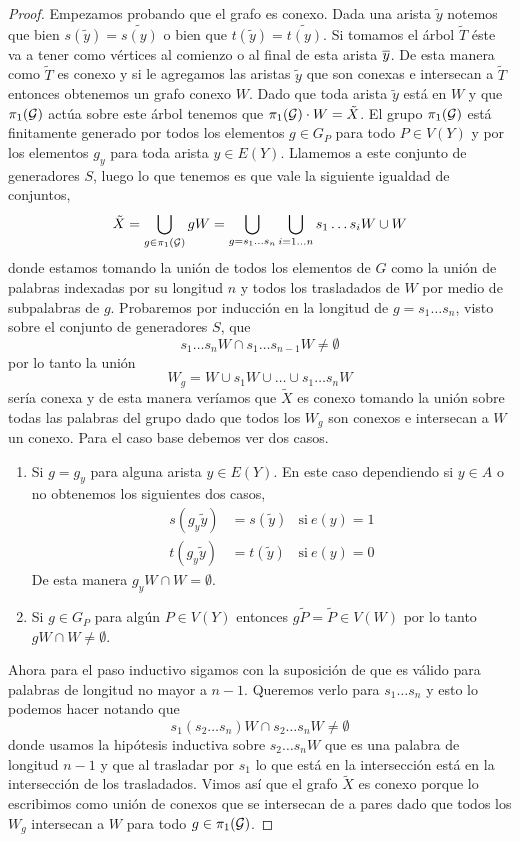 \documentclass[tesis.tex]{subfiles}
\begin{document}
\begin{proof}
	Empezamos probando que el grafo es conexo.
	Dada una arista $\tilde y$ notemos que bien $s(\tilde y) = \widetilde{s(y)}$ o bien que $t(\tilde y) = \widetilde{t(y)}$.
	Si tomamos el árbol $\tilde T$ éste va a tener como vértices al comienzo o al final de esta arista $\overline y$.
	De esta manera como $\tilde T$ es conexo y si le agregamos las aristas $\tilde y$ que son conexas e intersecan a $\tilde T$ entonces obtenemos un grafo conexo $W$.
	Dado que toda arista $\tilde y$ está en $W$ y que $\pi_1({\cal G})$ actúa sobre este árbol tenemos que $\pi_1({\cal G}) \cdot W = \tilde X$.
	El grupo $\pi_1({\cal G})$ está finitamente generado por todos los elementos $g \in G_P$ para todo $P \in V(Y)$ y por los elementos $g_y$ para toda arista $y \in E(Y)$.
	Llamemos a este conjunto de generadores $S$, luego lo que tenemos es que vale la siguiente igualdad de conjuntos,
	\[
		\tilde X = \bigcup_{g \in \pi_1({\cal G})} gW = \bigcup_{g=s_1 \dots s_n} \bigcup_{i=1 \dots n} s_{1}\dots s_{i} W  \cup W 
	\]  
	donde estamos tomando la unión de todos los elementos de $G$ como la unión de palabras indexadas por su longitud $n$ y todos los trasladados de $W$ por medio de subpalabras de $g$.
	Probaremos por inducción en la longitud de $g=s_1\dots s_n$, visto sobre el conjunto de generadores $S$, que 
	\[
		s_1\dots s_n W \cap s_1 \dots s_{n-1}W \neq \emptyset	
	\] 
	por lo tanto la unión 
	\[
	W_g = W \cup s_1W \cup \dots \cup s_1\dots s_{n}W
	\]
	sería conexa y de esta manera veríamos que $\tilde X$ es conexo tomando la unión sobre todas las palabras del grupo dado que todos los $W_g$ son conexos e intersecan a $W$ un conexo.
	Para el caso base debemos ver dos casos.
	\begin{enumerate}
		\item Si $g=g_y$ para alguna arista $y \in E(Y)$.
		En este caso dependiendo si $y \in A$ o no obtenemos los siguientes dos casos,
		\begin{align*}
			s(g_y \tilde y) &= s(\tilde y)   & \text{si} \ e(y) = 1 \\
			t(g_y \tilde y) &= t(\tilde y)   & \text{si} \ e(y) = 0 
		\end{align*}
		De esta manera $g_yW \cap W = \emptyset$.
		\item Si $g \in G_P$ para algún $P \in V(Y)$ entonces $g\tilde P = \tilde P \in V(W)$ por lo tanto $gW \cap W \neq \emptyset$. 
	\end{enumerate} 
	Ahora para el paso inductivo sigamos con la suposición de que es válido para palabras de longitud no mayor a $n-1$. 
	Queremos verlo para $s_1\dots s_n$ y esto lo podemos hacer notando que 
	\[
	s_1(s_2 \dots s_n) W \cap s_2 \dots s_{n} W \neq \emptyset 
	\]
	donde usamos la hipótesis inductiva sobre $s_2 \dots s_n W$ que es una palabra de longitud $n-1$ y que al trasladar por $s_1$ lo que está en la intersección está en la intersección de los trasladados.
	Vimos así que el grafo $\tilde X$ es conexo porque lo escribimos como unión de conexos que se intersecan de a pares dado que todos los $W_g$ intersecan a $W$ para todo $g \in \pi_1({\cal G})$.
	

\end{proof}
\end{document}
